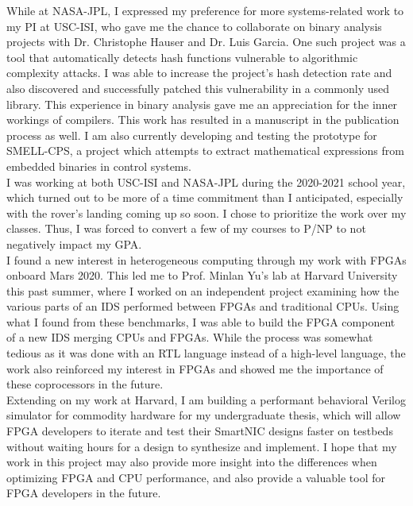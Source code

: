 \documentclass[11pt]{article}
\begin{document}
While at NASA-JPL, I expressed my preference for more systems-related work to my PI at USC-ISI, who gave me the chance to collaborate on binary analysis projects with Dr. Christophe Hauser and Dr. Luis Garcia. One such project was a tool that automatically detects hash functions vulnerable to algorithmic complexity attacks. I was able to increase the project’s hash detection rate and also discovered and successfully patched this vulnerability in a commonly used library. This experience in binary analysis gave me an appreciation for the inner workings of compilers. This work has resulted in a manuscript in the publication process as well. I am also currently developing and testing the prototype for SMELL-CPS, a project which attempts to extract mathematical expressions from embedded binaries in control systems.
\\

I was working at both USC-ISI and NASA-JPL during the 2020-2021 school year, which turned out to be more of a time commitment than I anticipated, especially with the rover’s landing coming up so soon. I chose to prioritize the work over my classes. Thus, I was forced to convert a few of my courses to P/NP to not negatively impact my GPA.
\\

I found a new interest in heterogeneous computing through my work with FPGAs onboard Mars 2020. This led me to Prof. Minlan Yu's lab at Harvard University this past summer, where I worked on an independent project examining how the various parts of an IDS performed between FPGAs and traditional CPUs. Using what I found from these benchmarks, I was able to build the FPGA component of a new IDS merging CPUs and FPGAs. While the process was somewhat tedious as it was done with an RTL language instead of a high-level language, the work also reinforced my interest in FPGAs and showed me the importance of these coprocessors in the future.
\\

Extending on my work at Harvard, I am building a performant behavioral Verilog simulator for commodity hardware for my undergraduate thesis, which will allow FPGA developers to iterate and test their SmartNIC designs faster on testbeds without waiting hours for a design to synthesize and implement. I hope that my work in this project may also provide more insight into the differences when optimizing FPGA and CPU performance, and also provide a valuable tool for FPGA developers in the future.
\\
\end{document}
